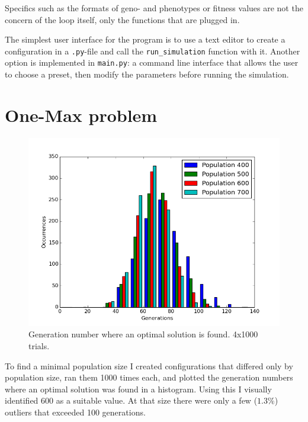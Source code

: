 
Specifics such as the formats of geno- and phenotypes or fitness values are not the concern of the loop itself,
only the functions that are plugged in.

The simplest user interface for the program is to use a text editor to create a configuration in a \texttt{.py}-file and call the \texttt{run\_simulation} function with it.
Another option is implemented in \texttt{main.py}:
a command line interface that allows the user to choose a preset,
then modify the parameters before running the simulation.

\section*{One-Max problem}
\begin{figure}[width=\textwidth]
    \begin{centering}
        \vspace{-1cm}
        \includegraphics[width=\linewidth]{img/3x1000.png}
        \caption{Generation number where an optimal solution is found. 4x1000 trials.}
        \label{different_population_sizes}
    \end{centering}
\end{figure}

To find a minimal population size I created configurations that differed only by population size,
ran them 1000 times each,
and plotted the generation numbers where an optimal solution was found in a histogram.
Using this I visually identified 600 as a suitable value.
At that size there were only a few ($1.3\%$) outliers that exceeded 100 generations.

